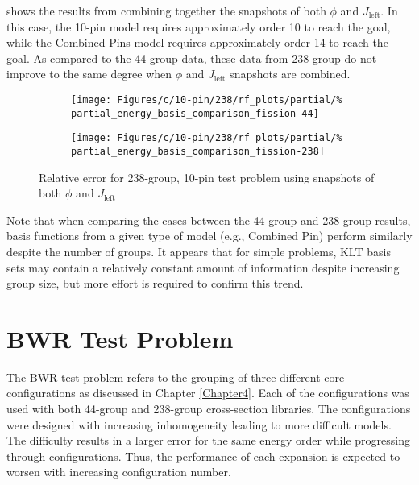  shows the results from combining 
together the snapshots of both $\phi$ and $J_{\text{left}}$. In this case, the 
10-pin model requires approximately order 10 to 
reach the goal, while the Combined-Pins model requires approximately order 14 
to 
reach the goal.  As compared to the 44-group data, these data from 238-group do 
not improve to the same degree when $\phi$ and $J_{\text{left}}$ 
snapshots are combined.

\begin{figure*}[tb]
    \centering
    \begin{subfigure}{0.5\textwidth}
        \centering
        \texttt{[image: Figures/c/10-pin/238/rf\_plots/partial/\%
            partial\_energy\_basis\_comparison\_fission-44]}
    \end{subfigure}%
    \begin{subfigure}{0.5\textwidth}
        \centering
        \texttt{[image: Figures/c/10-pin/238/rf\_plots/partial/\%
            partial\_energy\_basis\_comparison\_fission-238]}
    \end{subfigure}
    \caption{Relative error for 238-group, 10-pin test problem using snapshots 
        of both $\phi$ and $J_{\text{left}}$}
    \label{fig:10-pin-238combined}
\end{figure*}

Note that when comparing the cases between the 44-group and 238-group results, 
basis functions from a given type of model (e.g., Combined Pin) perform 
similarly despite the number of groups.  It appears that for simple problems, 
KLT basis sets may contain a relatively constant amount of information despite increasing 
group size, 
but more effort is required to confirm this trend.

\section{BWR Test Problem}

The BWR test problem refers to the grouping of three 
different core configurations 
as discussed in Chapter \ref{Chapter4}.  Each of the configurations 
was used with both 44-group and 238-group cross-section libraries.  The 
configurations were designed with increasing inhomogeneity leading to more difficult 
models. The difficulty results in a larger error for the same energy order while progressing 
    through configurations. Thus, the performance of 
each expansion is expected to worsen with increasing configuration number.  

